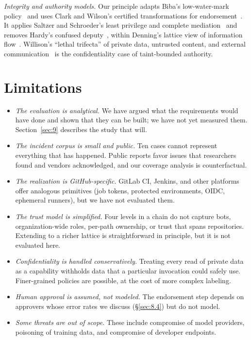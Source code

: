 \documentclass[acmsmall,screen,review]{acmart}
\begin{document}
\emph{Integrity and authority models.} Our principle adapts Biba's low-water-mark policy~\cite{biba1977integrity} and uses Clark and Wilson's certified transformations for endorsement~\cite{clark1987comparison}. It applies Saltzer and Schroeder's least privilege and complete mediation~\cite{saltzer1975protection} and removes Hardy's confused deputy~\cite{hardy1988confused}, within Denning's lattice view of information flow~\cite{denning1976lattice}. Willison's ``lethal trifecta'' of private data, untrusted content, and external communication~\cite{willison2025lethal} is the confidentiality case of taint-bounded authority.


\section{Limitations}\label{sec:11}

\begin{itemize}
\item \emph{The evaluation is analytical.} We have argued what the requirements would have done and shown that they can be built; we have not yet measured them. Section~\ref{sec:9} describes the study that will.
\item \emph{The incident corpus is small and public.} Ten cases cannot represent everything that has happened. Public reports favor issues that researchers found and vendors acknowledged, and our coverage analysis is counterfactual.
\item \emph{The realization is GitHub-specific.} GitLab CI, Jenkins, and other platforms offer analogous primitives (job tokens, protected environments, OIDC, ephemeral runners), but we have not evaluated them.
\item \emph{The trust model is simplified.} Four levels in a chain do not capture bots, organization-wide roles, per-path ownership, or trust that spans repositories. Extending to a richer lattice is straightforward in principle, but it is not evaluated here.
\item \emph{Confidentiality is handled conservatively.} Treating every read of private data as a capability withholds data that a particular invocation could safely use. Finer-grained policies are possible, at the cost of more complex labeling.
\item \emph{Human approval is assumed, not modeled.} The endorsement step depends on approvers whose error rates we discuss (\S\ref{sec:8.4}) but do not model.
\item \emph{Some threats are out of scope.} These include compromise of model providers, poisoning of training data, and compromise of developer endpoints.
\end{itemize}
\end{document}

